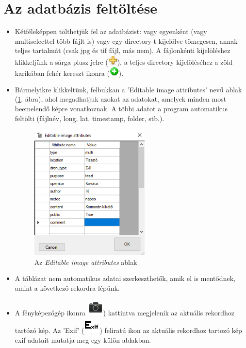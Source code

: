 \documentclass[a4paper,12pt]{book}
\begin{document}
\section{Az adatbázis feltöltése}

\begin{itemize}
	\item Kétféleképpen tölthetjük fel az adatbázist: vagy egyenként (vagy multiselecttel több fájlt is) vagy egy directory-t kijelölve tömegesen, annak teljes tartalmát (csak jpg és tif fájl, más nem). A fájlonkénti kijelöléshez klikkeljünk a sárga plusz jelre (\includegraphics[width=0.5cm]{plus.png}), a teljes directory kijelöléséhez a zöld karikában fehér kereszt ikonra (\includegraphics[width=0.5cm]{addfolder.png}).
	
	\item Bármelyikre klikkeltünk, felbukkan a 'Editable image attributes' nevű ablak (\ref{fig:editableimageattribute}. ábra), ahol megadhatjuk azokat az adatokat, amelyek minden most beemelendő képre vonatkoznak. A többi adatot a program automatikus feltölti (fájlnév, long, lat, timestamp, folder, stb.).
	
	\begin{figure}
		\centering
		\includegraphics[width=6cm]{editableimageattributes.png}
		\caption{Az \textit{Editable image attributes} ablak}
		\label{fig:editableimageattribute}
	\end{figure}
	
	\item A táblázat nem automatikus adatai szerkeszthetők, amik el is mentődnek, amint a következő rekordra lépünk.
	
	\item A fényképezőgép ikonra \includegraphics[width = 0.5 cm]{camera.png}) kattintva megjelenik az aktuális rekordhoz tartózó kép. Az 'Exif' (\includegraphics[width = 0.6 cm]{exif.png}) feliratú ikon az aktuális rekordhoz tartozó kép exif adatait mutatja meg egy külön ablakban.
\end{itemize}
\end{document}
